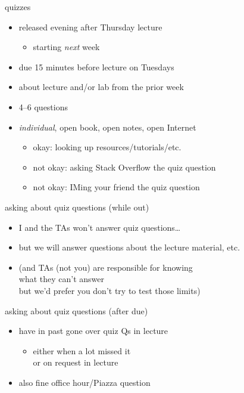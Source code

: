 \begin{frame}{quizzes}
    \begin{itemize}
    \item released evening after Thursday lecture
        \begin{itemize}
        \item starting \textit{next} week
        \end{itemize}
    \item due 15 minutes before lecture on Tuesdays
    \vspace{.5cm}
    \item about lecture and/or lab from the prior week
    \item 4--6 questions
    \item \textit{individual}, open book, open notes, open Internet
        \begin{itemize}
        \item okay: looking up resources/tutorials/etc.
        \item not okay: asking Stack Overflow the quiz question
        \item not okay: IMing your friend the quiz question
        \end{itemize}
    \end{itemize}
\end{frame}

\begin{frame}{asking about quiz questions (while out)}
    \begin{itemize}
    \item I and the TAs won't answer quiz questions\ldots
    \item but we will answer questions about the lecture material, etc.
    \vspace{.5cm}
    \item (and TAs (not you) are responsible for knowing \\
        what they can't answer \\
        but we'd prefer you don't try to test those limits)
    \end{itemize}
\end{frame}

\begin{frame}{asking about quiz questions (after due)}
    \begin{itemize}
    \item have in past gone over quiz Qs in lecture
        \begin{itemize}
        \item either when a lot missed it \\
             or on request in lecture
         \end{itemize}
    \item also fine office hour/Piazza question
    \end{itemize}
\end{frame}
